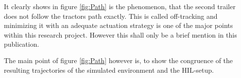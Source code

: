 \documentclass[root.tex]{subfiles}
\begin{document}
	It clearly shows in figure \ref{fig:Path} is the phenomenon, that the second trailer does not follow  the tractors path exactly. This is called off-tracking and minimizing it with an adequate actuation strategy is one of the major points within this research project. However this shall only be a brief mention in this publication. 
	
	The main point of figure \ref{fig:Path} however is, to show the congruence of the resulting trajectories of the simulated environment and the \gls{HIL}-setup. 
	
	
	
	
		
	

	
\end{document}

